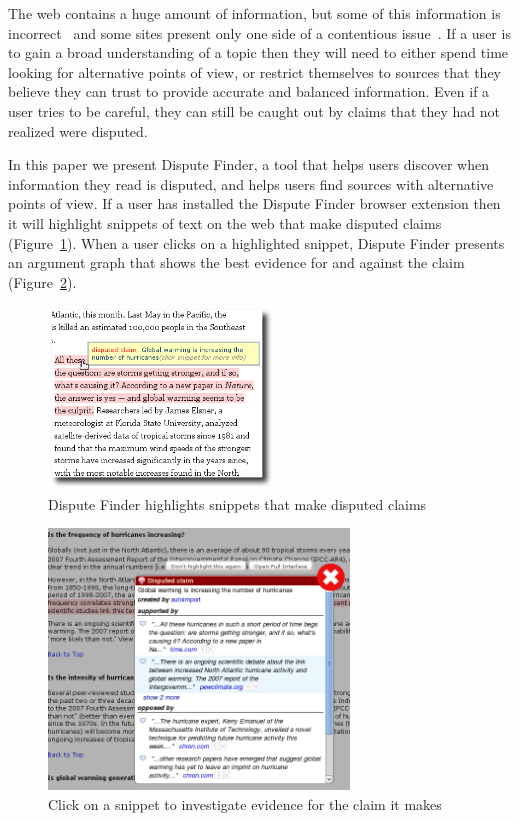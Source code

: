 \documentclass{www2010-submission}
\newcommand{\todo}[1]{}
\begin{document}
 

The web contains a huge amount of information, but some of this information is incorrect~\cite{Neumann2003,Resnik1998,Zhou2004} and some sites present only one side of a contentious issue~\cite{Herman2002}. 
If a user is to gain a broad understanding of a topic then they will need to either spend time looking for alternative points of view, or restrict themselves to sources that they believe they can trust to provide accurate and balanced information.
Even if a user tries to be careful, they can still be caught out by claims that they had not realized were disputed.
\todo{word this better}\todo{update all screenshots}

In this paper we present Dispute Finder, a tool that helps users discover when information they read is disputed, and helps users find sources with alternative points of view. 
If a user has installed the Dispute Finder browser extension then it will highlight snippets of text on the web that make disputed claims (Figure~\ref{highlight}). 
When a user clicks on a highlighted snippet, Dispute Finder presents an argument graph that shows the best evidence for and against the claim (Figure~\ref{claimview}). 

\begin{figure}[tb]
	\begin{center}
	\includegraphics[width=6cm]{../screenshots/v2_highlight_shadow.png}
	\caption{Dispute Finder highlights snippets that make disputed claims}
	\label{highlight}
	\end{center}
\end{figure}

\begin{figure}[tb]
	\begin{center}
	\includegraphics[width=8cm]{../screenshots/v2_popup_dim2.png}
	\caption{Click on a snippet to investigate evidence for the claim it makes}
	\label{claimview}
	\end{center}
\end{figure}
\end{document}
